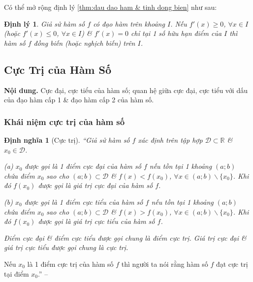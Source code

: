 \documentclass{article}
\numberwithin{equation}{section}
\newtheorem{dinhnghia}{Định nghĩa}[section]
\newtheorem{dinhly}{Định lý}[section]
\begin{document}
Có thể mở rộng định lý \ref{thm:dau dao ham & tinh dong bien} như sau:

\begin{dinhly}
	Giả sử hàm số $f$ có đạo hàm trên khoảng $I$. Nếu $f'(x)\ge 0$, $\forall x\in I$ (hoặc $f'(x)\le 0$, $\forall x\in I$) \& $f'(x) = 0$ chỉ tại 1 số hữu hạn điểm của $I$ thì hàm số $f$ đồng biến (hoặc nghịch biến) trên $I$.
\end{dinhly}


\subsection{Cực Trị của Hàm Số}
\textsf{\textbf{Nội dung.} Cực đại, cực tiểu của hàm số; quan hệ giữa cực đại, cực tiểu với dấu của đạo hàm cấp 1 \& đạo hàm cấp 2 của hàm số.}

\subsubsection{Khái niệm cực trị của hàm số}

\begin{dinhnghia}[Cực trị]
	``Giả sử hàm số $f$ xác định trên tập hợp $\mathcal{D}\subset\mathbb{R}$ \& $x_0\in\mathcal{D}$.
	\begin{enumerate*}
		\item[(a)] $x_0$ được gọi là 1 \emph{điểm cực đại} của hàm số $f$ nếu tồn tại 1 khoảng $(a;b)$ chứa điểm $x_0$ sao cho $(a;b)\subset\mathcal{D}$ \& $f(x) < f(x_0)$, $\forall x\in(a;b)\backslash\{x_0\}$. Khi đó $f(x_0)$ được gọi là \emph{giá trị cực đại} của hàm số $f$.
		\item[(b)] $x_0$ được gọi là 1 \emph{điểm cực tiểu} của hàm số $f$ nếu tồn tại 1 khoảng $(a;b)$ chứa điểm $x_0$ sao cho $(a;b)\subset\mathcal{D}$ \& $f(x) > f(x_0)$, $\forall x\in(a;b)\backslash\{x_0\}$. Khi đó $f(x_0)$ được gọi là \emph{giá trị cực tiểu} của hàm số $f$.
	\end{enumerate*}
	Điểm cực đại \& điểm cực tiểu được gọi chung là \emph{điểm cực trị}. Giá trị cực đại \& giá trị cực tiểu được gọi chung là \emph{cực trị}.
\end{dinhnghia}
Nếu $x_0$ là 1 điểm cực trị của hàm số $f$ thì người ta nói rằng hàm số $f$ đạt cực trị tại điểm $x_0$.'' -- \cite[p. 10]{SGK_Toan_12_giai_tich_nang_cao}
\end{document}
